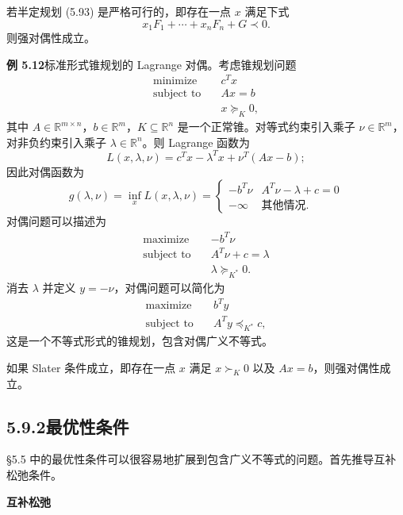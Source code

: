 \documentclass[UTF8,12pt,a4paper,fontset=fandol]{ctexart}
\begin{document}
若半定规划 (5.93) 是严格可行的，即存在一点 $x$ 满足下式
\[
x_1F_1+\cdots+x_nF_n+G\prec 0.
\]
则强对偶性成立。

\noindent\textbf{例 5.12}\quad 标准形式锥规划的 Lagrange 对偶。考虑锥规划问题
\[
\begin{aligned}
\text{minimize}\quad & c^Tx\\
\text{subject to}\quad & Ax=b\\
& x\succeq_K 0,
\end{aligned}
\]
其中 $A\in\mathbb{R}^{m\times n}$，$b\in\mathbb{R}^m$，$K\subseteq\mathbb{R}^n$ 是一个正常锥。对等式约束引入乘子 $\nu\in\mathbb{R}^m$，对非负约束引入乘子 $\lambda\in\mathbb{R}^n$。则 Lagrange 函数为
\[
L(x,\lambda,\nu)=c^Tx-\lambda^Tx+\nu^T(Ax-b);
\]
因此对偶函数为
\[
g(\lambda,\nu)=\inf_x L(x,\lambda,\nu)=
\begin{cases}
-b^T\nu & A^T\nu-\lambda+c=0\\
-\infty & \text{其他情况}.
\end{cases}
\]
对偶问题可以描述为
\[
\begin{aligned}
\text{maximize}\quad & -b^T\nu\\
\text{subject to}\quad & A^T\nu+c=\lambda\\
& \lambda\succeq_{K^\ast}0.
\end{aligned}
\]
消去 $\lambda$ 并定义 $y=-\nu$，对偶问题可以简化为
\[
\begin{aligned}
\text{maximize}\quad & b^Ty\\
\text{subject to}\quad & A^Ty\preceq_{K^\ast}c,
\end{aligned}
\]
这是一个不等式形式的锥规划，包含对偶广义不等式。

如果 Slater 条件成立，即存在一点 $x$ 满足 $x\succ_K0$ 以及 $Ax=b$，则强对偶性成立。

\subsection*{5.9.2\quad 最优性条件}

§5.5 中的最优性条件可以很容易地扩展到包含广义不等式的问题。首先推导互补松弛条件。

\noindent\textbf{互补松弛}
\end{document}
